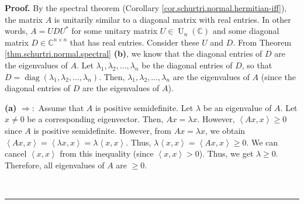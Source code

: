 \documentclass[numbers=enddot,12pt,final,onecolumn,notitlepage]{scrartcl}%
\numberwithin{exer}{subsection}
\theoremstyle{definition}
\newenvironment{proof}[1][Proof]{\noindent\textbf{#1.} }{\ \rule{0.5em}{0.5em}}
\begin{document}
\begin{proof}
By the spectral theorem (Corollary \ref{cor.schurtri.normal.hermitian-iff}),
the matrix $A$ is unitarily similar to a diagonal matrix with real entries. In
other words, $A=UDU^{\ast}$ for some unitary matrix $U\in\operatorname*{U}%
\nolimits_{n}\left(  \mathbb{C}\right)  $ and some diagonal matrix
$D\in\mathbb{C}^{n\times n}$ that has real entries. Consider these $U$ and
$D$. From Theorem \ref{thm.schurtri.normal.spectral} \textbf{(b)}, we know
that the diagonal entries of $D$ are the eigenvalues of $A$. Let $\lambda
_{1},\lambda_{2},\ldots,\lambda_{n}$ be the diagonal entries of $D$, so that
$D=\operatorname*{diag}\left(  \lambda_{1},\lambda_{2},\ldots,\lambda
_{n}\right)  $. Then, $\lambda_{1},\lambda_{2},\ldots,\lambda_{n}$ are the
eigenvalues of $A$ (since the diagonal entries of $D$ are the eigenvalues of
$A$). \medskip

\textbf{(a)} $\Longrightarrow:$ Assume that $A$ is positive semidefinite. Let
$\lambda$ be an eigenvalue of $A$. Let $x\neq0$ be a corresponding
eigenvector. Then, $Ax=\lambda x$. However, $\left\langle Ax,x\right\rangle
\geq0$ since $A$ is positive semidefinite. However, from $Ax=\lambda x$, we
obtain $\left\langle Ax,x\right\rangle =\left\langle \lambda x,x\right\rangle
=\lambda\left\langle x,x\right\rangle $. Thus, $\lambda\left\langle
x,x\right\rangle =\left\langle Ax,x\right\rangle \geq0$. We can cancel
$\left\langle x,x\right\rangle $ from this inequality (since $\left\langle
x,x\right\rangle >0$). Thus, we get $\lambda\geq0$. Therefore, all eigenvalues
of $A$ are $\geq0$.


\end{proof}
\end{document}
